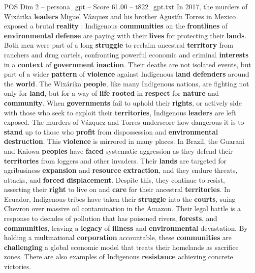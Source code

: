 \begin{textsample}{POS Dim 2 – persona\_gpt – Score 61.00 – t822\_gpt.txt}  \label{ex:f2_pos_008}
In 2017, the murders of Wixárika \textbf{leaders} Miguel Vázquez and his brother Agustín Torres in Mexico exposed a brutal \textbf{reality} : Indigenous \textbf{communities} on the \textbf{frontlines} of \textbf{environmental} \textbf{defense} are paying with their \textbf{lives} for protecting their \textbf{lands}.
Both men were part of a long \textbf{struggle} to reclaim ancestral \textbf{territory} from ranchers and drug cartels, confronting powerful economic and criminal \textbf{interests} in a \textbf{context} of \textbf{government} \textbf{inaction}.
Their deaths are not isolated events, but part of a wider \textbf{pattern} of \textbf{violence} against Indigenous \textbf{land} \textbf{defenders} around the \textbf{world}.
The Wixárika \textbf{people}, like many Indigenous nations, are fighting not only for \textbf{land}, but for a way of \textbf{life} \textbf{rooted} in \textbf{respect} for \textbf{nature} and \textbf{community}.
When \textbf{governments} fail to uphold their \textbf{rights}, or actively side with those who seek to exploit their \textbf{territories}, Indigenous \textbf{leaders} are left exposed.
The murders of Vázquez and Torres underscore how dangerous it is to \textbf{stand} up to those who \textbf{profit} from dispossession and \textbf{environmental} \textbf{destruction}.
This \textbf{violence} is mirrored in many places.
In Brazil, the Guarani and Kaiowa \textbf{peoples} have \textbf{faced} systematic aggression as they defend their \textbf{territories} from loggers and other invaders.
Their \textbf{lands} are targeted for agribusiness \textbf{expansion} and \textbf{resource} \textbf{extraction}, and they endure threats, attacks, and \textbf{forced} \textbf{displacement}.
Despite this, they continue to resist, asserting their \textbf{right} to live on and \textbf{care} for their ancestral \textbf{territories}.
In Ecuador, Indigenous tribes have taken their \textbf{struggle} into the \textbf{courts}, suing Chevron over massive oil contamination in the Amazon.
Their legal battle is a response to decades of pollution that has poisoned rivers, \textbf{forests}, and \textbf{communities}, leaving a \textbf{legacy} of \textbf{illness} and \textbf{environmental} devastation.
By holding a multinational \textbf{corporation} accountable, these \textbf{communities} are \textbf{challenging} a global economic model that treats their homelands as sacrifice zones.
There are also examples of Indigenous \textbf{resistance} achieving concrete victories.

\end{textsample}
